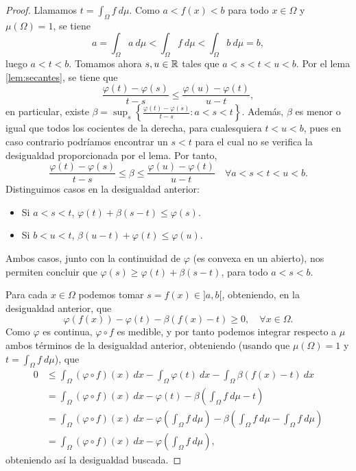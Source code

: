\documentclass{book}
\begin{document}
\begin{proof}
	Llamamos $t = \int_{\Omega} f\ d\mu$. Como $a < f(x) < b$ para todo $x \in \Omega$ y $\mu(\Omega) = 1$, se tiene
	\[a = \int_{\Omega} a \ d\mu < \int_{\Omega}f\ d\mu < \int_{\Omega} b \ d\mu = b, \]
	luego $a < t < b$. Tomamos ahora $s,u \in \mathbb{R}$ tales que $a < s < t < u < b$. Por el lema \ref{lem:secantes}, se tiene que
	\[ \frac{\varphi(t)- \varphi(s)}{t-s} \le \frac{\varphi(u) - \varphi(t)}{u-t}, \]
	en particular, existe $\beta = \sup_{s} \left\{ \frac{\varphi(t)-\varphi(s)}{t-s} \colon a < s < t \right\}$. Además, $\beta$ es menor o igual que todos los cocientes de la derecha, para cualesquiera $t < u < b$, pues en caso contrario podríamos encontrar un $s < t$ para el cual no se verifica la desigualdad proporcionada por el lema. Por tanto,
	\begin{equation}
		\frac{\varphi(t)-\varphi(s)}{t-s} \le \beta \le \frac{\varphi(u) - \varphi(t)}{u-t} \quad \forall a < s < t < u < b.
	\end{equation}
	Distinguimos casos en la desigualdad anterior:
	\begin{itemize}
		\item Si $a < s < t$, $\varphi(t) + \beta (s-t) \le \varphi(s)$.
		\item Si $b < u < t$, $\beta(u-t) + \varphi(t) \le \varphi(u)$.
	\end{itemize}
	Ambos casos, junto con la continuidad de $\varphi$ (es convexa en un abierto), nos permiten concluir que $\varphi(s) \ge \varphi(t) + \beta(s-t)$, para todo $a < s < b$.

	Para cada $x \in \Omega$ podemos tomar $s = f(x) \in ]a,b[$, obteniendo, en la desigualdad anterior, que
	\begin{equation} \label{eq:jensen:1}
		\varphi(f(x)) - \varphi(t) - \beta(f(x) - t) \ge 0, \quad \forall x \in \Omega.
	\end{equation}
	Como $\varphi$ es continua, $\varphi \circ f$ es medible, y por tanto podemos integrar respecto a $\mu$ ambos términos de la desigualdad anterior, obteniendo (usando que $\mu(\Omega) = 1$ y $t = \int_{\Omega}f\ d\mu$), que
	\begin{align*}
		0 &\le \int_{\Omega}(\varphi \circ f)(x) \ dx - \int_{\Omega} \varphi(t)\ dx - \int_{\Omega}\beta(f(x)-t)\ dx \\
		  &= \int_{\Omega}(\varphi \circ f)(x)\ dx - \varphi(t) - \beta\left( \int_{\Omega} f \ d\mu - t\right) \\
		  &= \int_{\Omega}(\varphi \circ f)(x)\ dx - \varphi\left( \int_{\Omega}f\ d\mu \right) - \beta\left(\int_{\Omega} f \ d\mu - \int_{\Omega} f \ d\mu\right) \\
		  &= \int_{\Omega}(\varphi \circ f)(x)\ dx - \varphi\left( \int_{\Omega}f\ d\mu \right),
	\end{align*}
	obteniendo así la desigualdad buscada.


\end{proof}
\end{document}
